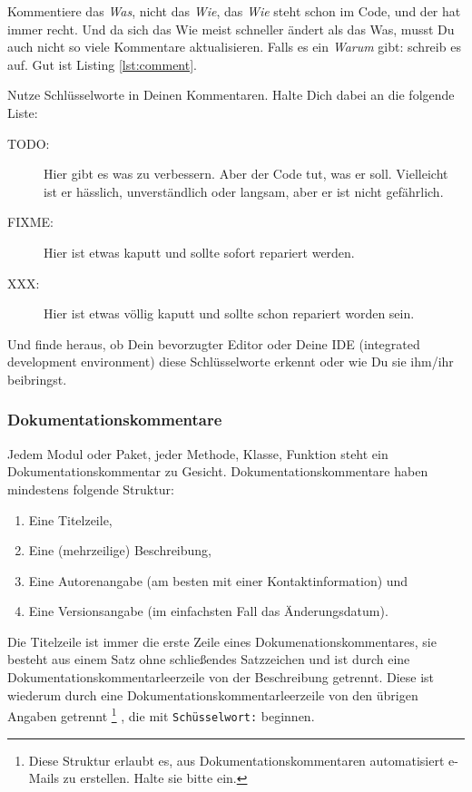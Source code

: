 \documentclass[twoside]{scrartcl}
\providecommand{\code}[1]{\texttt{#1}}
\begin{document}
Kommentiere das \emph{Was}, nicht das \emph{Wie}, das \emph{Wie} steht schon im 
Code, und der hat immer recht.
Und da sich das Wie meist schneller \"a{}ndert als das Was, musst Du auch
nicht so viele Kommentare aktualisieren.
Falls es ein \emph{Warum} gibt: schreib es auf. 
Gut ist  Listing \ref{lst:comment}.



Nutze Schl\"u{}sselworte in Deinen Kommentaren. Halte Dich dabei an die folgende
Liste:
\begin{description}
\item[TODO:] Hier gibt es was zu verbessern. Aber der Code tut, was er soll.
  Vielleicht ist er h\"a{}sslich, unverst\"a{}ndlich oder langsam,
  aber er ist nicht gef\"a{}hrlich.
\item[FIXME:] Hier ist etwas kaputt und sollte sofort repariert werden.
\item[XXX:] Hier ist etwas v\"o{}llig kaputt und sollte schon repariert
  worden sein.
\end{description}
Und finde heraus, ob Dein bevorzugter Editor oder Deine IDE (integrated
development environment) diese Schl\"u{}sselworte erkennt oder wie Du sie
ihm/ihr beibringst.

\subsubsection{Dokumentationskommentare\label{sec:doccom}}
Jedem Modul oder Paket, jeder Methode, Klasse, Funktion steht ein
Dokumentationskommentar zu Gesicht. Dokumentationskommentare haben mindestens 
folgende Struktur:
\begin{enumerate}
    \item Eine Titelzeile,
    \item Eine (mehrzeilige) Beschreibung,
    \item Eine Autorenangabe (am besten mit einer Kontaktinformation) und
    \item Eine Versionsangabe (im einfachsten Fall das \"A{}nderungsdatum).
\end{enumerate}
Die Titelzeile ist immer die erste Zeile eines Dokumenationskommentares, sie
besteht aus einem Satz ohne schlie\ss{}endes Satzzeichen und ist durch eine
Dokumentationskommentarleerzeile von der Beschreibung getrennt. Diese ist
wiederum durch eine Dokumentationskommentarleerzeile von den \"u{}brigen Angaben
getrennt%
\footnote{Diese Struktur erlaubt es, aus Dokumentationskommentaren
automatisiert e-Mails zu erstellen. Halte sie bitte ein.}%
, die mit \code{Sch\"u{}sselwort:} beginnen.
\end{document}
